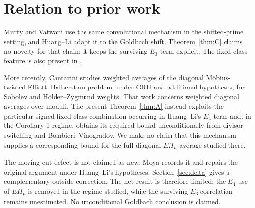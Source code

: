 \documentclass[11pt,a4paper]{article}
\theoremstyle{plain}
\theoremstyle{definition}
\theoremstyle{remark}
\begin{document}
\section{Relation to prior work}\label{sec:lit}
Murty and Vatwani \cite{MV17} use the same convolutional mechanism in
the shifted-prime setting, and Huang--Li \cite{HL} adapt it to the
Goldbach shift.  Theorem~\ref{thm:C} claims no novelty for that chain;
it keeps the surviving $E_3$ term explicit.  The fixed-class feature is
also present in \cite{MV17,HL}.

More recently, Cantarini \cite{Cantarini} studies weighted averages of
the diagonal M\"obius-twisted Elliott--Halberstam problem, under GRH and
additional hypotheses, for Sobolev and H\"older--Zygmund weights.  That
work concerns weighted diagonal averages over moduli.  The present
Theorem~\ref{thm:A} instead exploits the particular signed fixed-class
combination occurring in Huang--Li's $E_4$ term and, in the
Corollary-1 regime, obtains its required bound unconditionally from
divisor switching and Bombieri--Vinogradov.  We make no claim that this
mechanism supplies a corresponding bound for the full diagonal
$EH_\mu$ average studied there.

The moving-cut defect is not claimed as new: Moya \cite{Moya} records
it and repairs the original argument under Huang--Li's hypotheses.
Section~\ref{sec:delta} gives a complementary outside correction.  The
net result is therefore limited: the $E_4$ use of $EH_\mu$ is removed
in the regime studied, while the surviving $E_3$ correlation remains
unestimated.  No unconditional Goldbach conclusion is claimed.
\end{document}
